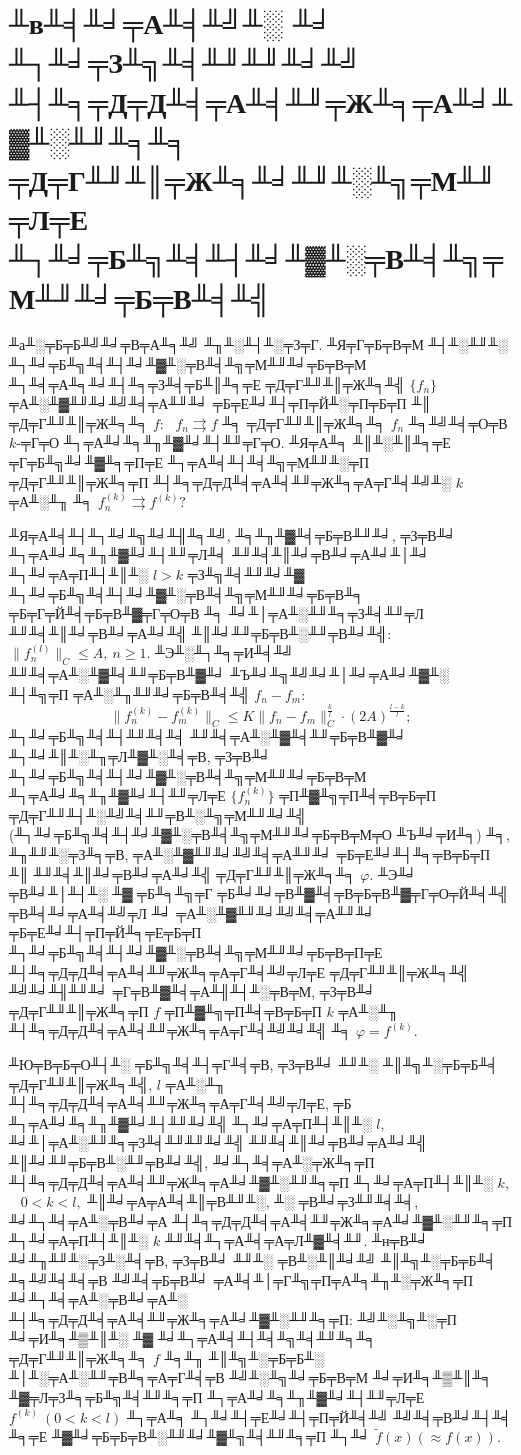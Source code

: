  \section{╨в╨╡╨╛╤А╨╡╨╝╨░ ╨╛ ╨┐╨╛╤З╨╗╨╡╨╜╨╜╨╛╨╝ ╨┤╨╕╤Д╤Д╨╡╤А╨╡╨╜╤Ж╨╕╤А╨╛╨▓╨░╨╜╨╕╨╕\\ ╤Д╤Г╨╜╨║╤Ж╨╕╨╛╨╜╨░╨╗╤М╨╜╤Л╤Е
 ╨┐╨╛╤Б╨╗╨╡╨┤╨╛╨▓╨░╤В╨╡╨╗╤М╨╜╨╛╤Б╤В╨╡╨╣}

 ╨а╨░╤Б╤Б╨╝╨╛╤В╤А╨╕╨╝ ╨╖╨░╨┤╨░╤З╤Г. ╨Я╤Г╤Б╤В╤М ╨┤╨░╨╜╨░ ╨┐╨╛╤Б╨╗╨╡╨┤╨╛╨▓╨░╤В╨╡╨╗╤М╨╜╨╛╤Б╤В╤М ╨┐╨╡╤А╨╕╨╛╨┤╨╕╤З╨╡╤Б╨║╨╕╤Е
 ╤Д╤Г╨╜╨║╤Ж╨╕╨╣ $\{f_n\}$ ╤А╨░╨▓╨╜╨╛╨╝╨╡╤А╨╜╨╛ ╤Б╤Е╨╛╨┤╤П╤Й╨░╤П╤Б╤П ╨║ ╤Д╤Г╨╜╨║╤Ж╨╕╨╕ $f$:~ $f_n\rightrightarrows
 f$ ╨╕ ╤Д╤Г╨╜╨║╤Ж╨╕╨╕ $f_n$ ╨╕╨╝╨╡╤О╤В $k$-╤Г╤О ╨┐╤А╨╛╨╕╨╖╨▓╨╛╨┤╨╜╤Г╤О.
 ╨Я╤А╨╕ ╨║╨░╨║╨╕╤Е ╤Г╤Б╨╗╨╛╨▓╨╕╤П╤Е ╨┐╤А╨╡╨┤╨╡╨╗╤М╨╜╨░╤П ╤Д╤Г╨╜╨║╤Ж╨╕╤П ╨┤╨╕╤Д╤Д╨╡╤А╨╡╨╜╤Ж╨╕╤А╤Г╨╡╨╝╨░ $k$
 ╤А╨░╨╖ ╨╕ $f_n^{(k)} \rightrightarrows f^{(k)}?$

╨Я╤А╨╡╨┤╨┐╨╛╨╗╨╛╨╢╨╕╨╝, ╨╕╨╖╨▓╨╡╤Б╤В╨╜╨╛, ╤З╤В╨╛ ╨┐╤А╨╛╨╕╨╖╨▓╨╛╨┤╨╜╤Л╨╡ ╨╜╨╡╨║╨╛╤В╨╛╤А╨╛╨│╨╛ ╨┐╨╛╤А╤П╨┤╨║╨░  $l>k$ ╤З╨╗╨╡╨╜╨╛╨▓
╨┐╨╛╤Б╨╗╨╡╨┤╨╛╨▓╨░╤В╨╡╨╗╤М╨╜╨╛╤Б╤В╨╕ ╤Б╤Г╤Й╨╡╤Б╤В╨▓╤Г╤О╤В ╨╕ ╨╛╨│╤А╨░╨╜╨╕╤З╨╡╨╜╤Л ╨╜╨╡╨║╨╛╤В╨╛╤А╨╛╨╣ ╨║╨╛╨╜╤Б╤В╨░╨╜╤В╨╛╨╣:
 $\|f_n^{(l)}\|_C\le {A},\ n\ge 1.$
 ╨Э╨░╨┐╨╕╤И╨╡╨╝ ╨╜╨╡╤А╨░╨▓╨╡╨╜╤Б╤В╨▓╨╛ ╨Ъ╨╛╨╗╨╝╨╛╨│╨╛╤А╨╛╨▓╨░ ╨┤╨╗╤П ╤А╨░╨╖╨╜╨╛╤Б╤В╨╡╨╣ $f_n-f_m$:
  $$
 \|f_n^{(k)}-f_m^{(k)}\|_C\le K \|f_n-f_m\|_C^{\frac{k}{l}}\cdot
 (2{A})^{\frac{l-k}{l}};
 $$
 ╨┐╨╛╤Б╨╗╨╡╨┤╨╜╨╡╨╡ ╨╜╨╡╤А╨░╨▓╨╡╨╜╤Б╤В╨▓╨╛ ╨┐╨╛╨║╨░╨╖╤Л╨▓╨░╨╡╤В, ╤З╤В╨╛ ╨┐╨╛╤Б╨╗╨╡╨┤╨╛╨▓╨░╤В╨╡╨╗╤М╨╜╨╛╤Б╤В╤М ╨┐╤А╨╛╨╕╨╖╨▓╨╛╨┤╨╜╤Л╤Е $\{f_n^{(k)}\}$
 ╤П╨▓╨╗╤П╨╡╤В╤Б╤П ╤Д╤Г╨╜╨┤╨░╨╝╨╡╨╜╤В╨░╨╗╤М╨╜╨╛╨╣ (╨┐╨╛╤Б╨╗╨╡╨┤╨╛╨▓╨░╤В╨╡╨╗╤М╨╜╨╛╤Б╤В╤М╤О ╨Ъ╨╛╤И╨╕) ╨╕, ╨╖╨╜╨░╤З╨╕╤В,
 ╤А╨░╨▓╨╜╨╛╨╝╨╡╤А╨╜╨╛ ╤Б╤Е╨╛╨┤╨╕╤В╤Б╤П ╨║ ╨╜╨╡╨║╨╛╤В╨╛╤А╨╛╨╣ ╤Д╤Г╨╜╨║╤Ж╨╕╨╕ $\varphi.$
 ╨Э╨╛ ╤В╨╛╨│╨┤╨░ ╨▓ ╤Б╨╕╨╗╤Г ╤Б╨╛╨╛╤В╨▓╨╡╤В╤Б╤В╨▓╤Г╤О╤Й╨╡╨╣ ╤В╨╡╨╛╤А╨╡╨╝╤Л ╨╛ ╤А╨░╨▓╨╜╨╛╨╝╨╡╤А╨╜╨╛ ╤Б╤Е╨╛╨┤╤П╤Й╨╕╤Е╤Б╤П
 ╨┐╨╛╤Б╨╗╨╡╨┤╨╛╨▓╨░╤В╨╡╨╗╤М╨╜╨╛╤Б╤В╤П╤Е ╨┤╨╕╤Д╤Д╨╡╤А╨╡╨╜╤Ж╨╕╤А╤Г╨╡╨╝╤Л╤Е ╤Д╤Г╨╜╨║╤Ж╨╕╨╣ ╨╝╨╛╨╢╨╜╨╛ ╤Г╤В╨▓╨╡╤А╨╢╨┤╨░╤В╤М,
 ╤З╤В╨╛ ╤Д╤Г╨╜╨║╤Ж╨╕╤П $f$ ╤П╨▓╨╗╤П╨╡╤В╤Б╤П $k$ ╤А╨░╨╖ ╨┤╨╕╤Д╤Д╨╡╤А╨╡╨╜╤Ж╨╕╤А╤Г╨╡╨╝╨╛╨╣ ╨╕ $\varphi=f^{(k)}$.

 ╨Ю╤В╤Б╤О╨┤╨░ ╤Б╨╗╨╡╨┤╤Г╨╡╤В, ╤З╤В╨╛ ╨╜╨░ ╨║╨╗╨░╤Б╤Б╨╡  ╤Д╤Г╨╜╨║╤Ж╨╕╨╣, $l$
 ╤А╨░╨╖ ╨┤╨╕╤Д╤Д╨╡╤А╨╡╨╜╤Ж╨╕╤А╤Г╨╡╨╝╤Л╤Е, ╤Б ╨┐╤А╨╛╨╕╨╖╨▓╨╛╨┤╨╜╨╛╨╣ ╨┐╨╛╤А╤П╨┤╨║╨░ $l,$ ╨╛╨│╤А╨░╨╜╨╕╤З╨╡╨╜╨╜╨╛╨╣ ╨╜╨╡╨║╨╛╤В╨╛╤А╨╛╨╣ ╨║╨╛╨╜╤Б╤В╨░╨╜╤В╨╛╨╣,
 ╨╛╨┐╨╡╤А╨░╤Ж╨╕╤П ╨┤╨╕╤Д╤Д╨╡╤А╨╡╨╜╤Ж╨╕╤А╨╛╨▓╨░╨╜╨╕╤П ╨┐╨╛╤А╤П╨┤╨║╨░  $k,$~ $0<k<l,$ ╨║╨╛╤А╤А╨╡╨║╤В╨╜╨░, ╨░ ╤В╨╛╤З╨╜╨╡╨╡, ╨╛╨┐╨╡╤А╨░╤В╨╛╤А
 ╨┤╨╕╤Д╤Д╨╡╤А╨╡╨╜╤Ж╨╕╤А╨╛╨▓╨░╨╜╨╕╤П ╨┐╨╛╤А╤П╨┤╨║╨░ $k$ ╨╜╨╡╨┐╤А╨╡╤А╤Л╨▓╨╡╨╜. ╨н╤В╨╛
 ╨╛╨╖╨╜╨░╤З╨░╨╡╤В, ╤З╤В╨╛ ╨╜╨░ ╤В╨░╨║╨╛╨╝ ╨║╨╗╨░╤Б╤Б╨╡ ╨╕╨╝╨╡╨╡╤В ╨╝╨╡╤Б╤В╨╛ ╤А╨╡╨│╤Г╨╗╤П╤А╨╕╨╖╨░╤Ж╨╕╤П ╨╛╨┐╨╡╤А╨░╤В╨╛╤А╨░
 ╨┤╨╕╤Д╤Д╨╡╤А╨╡╨╜╤Ж╨╕╤А╨╛╨▓╨░╨╜╨╕╤П: ╨╝╨░╨╗╨░╤П ╨╛╤И╨╕╨▒╨║╨░ ╨▓ ╨╛╨┐╤А╨╡╨┤╨╡╨╗╨╡╨╜╨╕╨╕ ╤Д╤Г╨╜╨║╤Ж╨╕╨╕ $f$
 ╨╕╨╖ ╨║╨╗╨░╤Б╤Б╨░ ╨│╨░╤А╨░╨╜╤В╨╕╤А╤Г╨╡╤В ╨╝╨░╨╗╨╛╤Б╤В╤М ╨╛╤И╨╕╨▒╨║╨╕ ╨▓╤Л╤З╨╕╤Б╨╗╨╡╨╜╨╕╤П
 ╨┐╤А╨╛╨╕╨╖╨▓╨╛╨┤╨╜╤Л╤Е $f^{(k)}\ (0<k<l)$ ╨┐╤А╨╕ ╨┐╨╛╨┤╤Е╨╛╨┤╤П╤Й╨╡╨╝ ╨╝╨╡╤В╨╛╨┤╨╡ ╨╕╤Е
 ╨▓╨╛╤Б╤Б╤В╨░╨╜╨╛╨▓╨╗╨╡╨╜╨╕╤П ╨┐╨╛ $\widetilde{f}(x) (\approx f(x)).$

